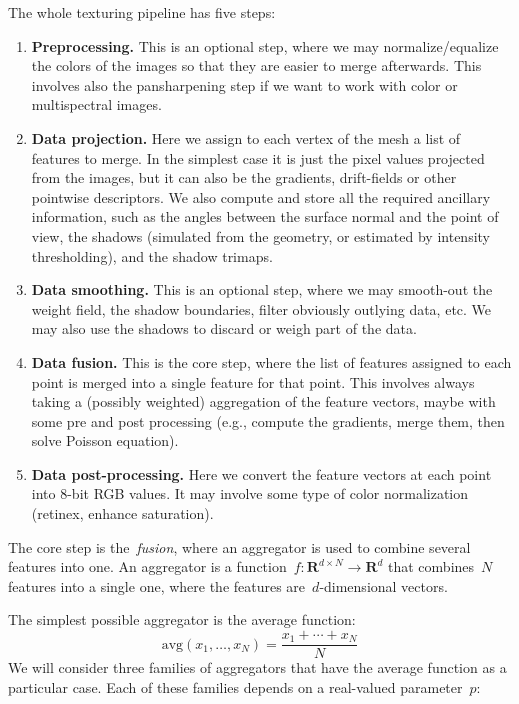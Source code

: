 \documentclass{article}
\def\R{\mathbf{R}} %
\begin{document}
The whole texturing pipeline has five steps:

\begin{enumerate}
	\item {\bf Preprocessing.} This is an optional step, where we may
		normalize/equalize the colors of the images so that they are
		easier to merge afterwards.  This involves also the
		pansharpening step if we want to work with color or
		multispectral images.
	\item {\bf Data projection.}
		Here we assign to each vertex of the mesh a list of
		features to merge.  In the simplest case it is just the pixel
		values projected from the images, but it can also be the
		gradients, drift-fields or other pointwise descriptors.
		We also compute and store all the required ancillary
		information, such as the angles between the surface normal
		and the point of view, the shadows (simulated from the
		geometry, or estimated by intensity thresholding), and the
		shadow trimaps.
	\item {\bf Data smoothing.}
		This is an optional step, where we may smooth-out the weight
		field, the shadow boundaries, filter obviously outlying data,
		etc.  We may also use the shadows to discard or weigh part of
		the data.
	\item {\bf Data fusion.}
		This is the core step, where the list of features assigned to
		each point is merged into a single feature for that point.
		This involves always taking a (possibly weighted)
		aggregation of the feature vectors, maybe with some pre and
		post processing (e.g., compute the gradients, merge them,
		then solve Poisson equation).
	\item {\bf Data post-processing.}
		Here we convert the feature vectors at each point into 8-bit RGB
		values.  It may involve some type of color normalization
		(retinex, enhance saturation).
\end{enumerate}

The core step is the~\emph{fusion}, where an aggregator is used to combine
several features into one.  An aggregator is a function~$f:\R^{d\times
N}\to\R^d$ that combines~$N$ features into a single one, where the features
are~$d$-dimensional vectors.

The simplest possible aggregator is the average function:
\[
	\mathrm{avg}(x_1,\ldots,x_N)=
	\frac{x_1+\cdots+x_N}{N}
\]
We will consider three families of aggregators that have the average function
as a particular case.  Each of these families depends on a real-valued
parameter~$p$:
\end{document}
